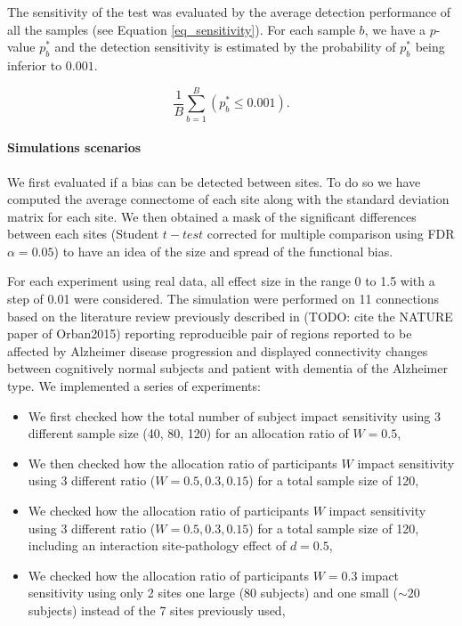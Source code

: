 \documentclass[authoryear]{elsarticle}
\begin{document}
The sensitivity of the test was evaluated by the average detection performance of all the samples (see Equation \ref{eq_sensitivity}). For each sample $b$, we have a $p$-value $p^{*}_b$ and the detection sensitivity is estimated by the probability of $p^{*}_b$ being inferior to $0.001$.

\begin{equation}
    \frac{1}{B}\sum\limits_{b=1}^B\left(p^{*}_b\leq0.001\right).
    \label{eq_sensitivity}
\end{equation}



\paragraph{Simulations scenarios}

We first evaluated if a bias can be detected between sites. To do so we have computed the average connectome of each site along with the standard deviation matrix for each site. We then obtained a mask of the significant differences between each sites (Student $t-test$ corrected for multiple comparison using FDR $\alpha=0.05$) to have an idea of the size and spread of the functional bias.

For each experiment using real data, all effect size in the range 0 to 1.5 with a step of 0.01 were considered. The simulation were performed on 11 connections based on the literature review previously described in (TODO: cite the NATURE paper of Orban2015) reporting reproducible pair of regions reported to be affected by Alzheimer disease progression and displayed connectivity changes between cognitively normal subjects and patient with dementia of the Alzheimer type. We implemented a series of experiments:

\begin{itemize}
  \item We first checked how the total number of subject impact sensitivity using 3 different sample size (40, 80, 120) for an allocation ratio of $W=0.5$,
  \item We then checked how the allocation ratio of participants $W$ impact sensitivity using 3 different ratio ($W=0.5,0.3,0.15$) for a total sample size of 120,
  \item We checked how the allocation ratio of participants $W$ impact sensitivity using 3 different ratio ($W=0.5,0.3,0.15$) for a total sample size of 120, including an interaction site-pathology effect of $d=0.5$,
  \item We checked how the allocation ratio of participants $W=0.3$ impact sensitivity using only 2 sites one large (80 subjects) and one small ($\sim20$ subjects) instead of the 7 sites previously used,
\end{itemize}
\end{document}
